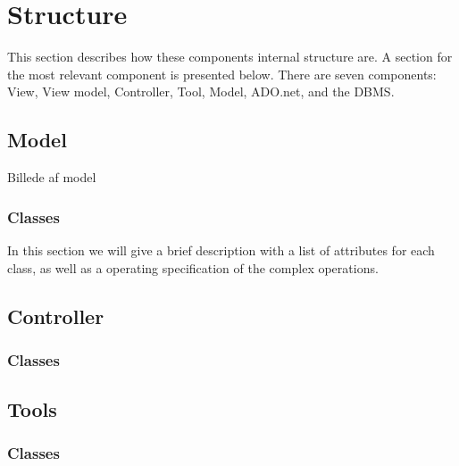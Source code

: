 \section{Structure}

This section describes how these components internal structure are.
A section for the most relevant component is presented below.
There are seven components: View, View model, Controller, Tool, Model, ADO.net, and the DBMS. 



\subsection{Model}

Billede af model


\subsubsection{Classes}
In this section we will give a brief description with a list of attributes for each class, as well as a operating specification of the complex operations.



\subsection{Controller}

\subsubsection{Classes}




\subsection{Tools}

\subsubsection{Classes}